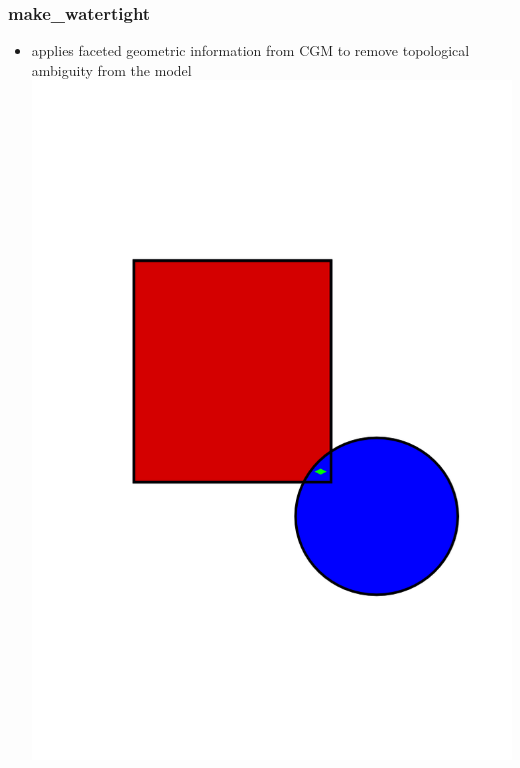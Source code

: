 \documentclass[14pt]{beamer}
\begin{document}
\begin{frame}
\frametitle{make\_watertight}
\begin{itemize}
\item applies faceted geometric information from CGM to remove topological ambiguity from the model
\includegraphics[scale=0.4, trim = 0 0 100 150]{VolOverlap.png}
\end{itemize}
\end{frame}
\end{document}

